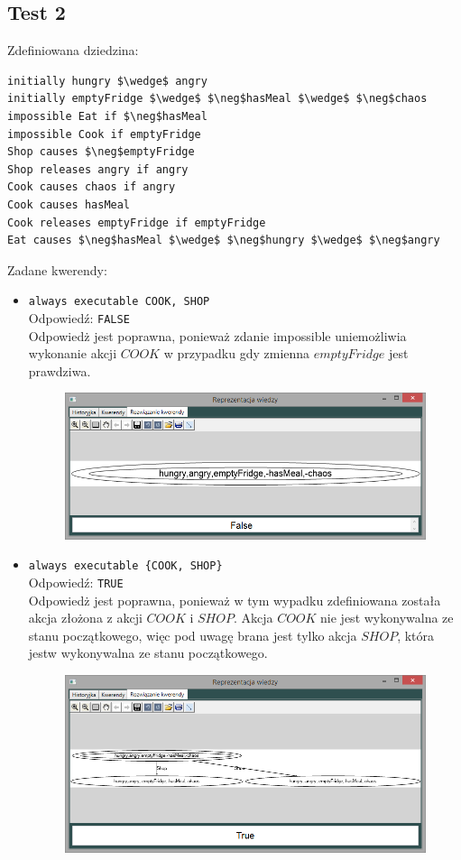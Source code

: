 \documentclass{article}
\begin{document}
\subsection{Test 2}
Zdefiniowana dziedzina:
\bigskip
{}
\begin{lstlisting}[mathescape=true]
initially hungry $\wedge$ angry
initially emptyFridge $\wedge$ $\neg$hasMeal $\wedge$ $\neg$chaos 
impossible Eat if $\neg$hasMeal 
impossible Cook if emptyFridge
Shop causes $\neg$emptyFridge
Shop releases angry if angry
Cook causes chaos if angry
Cook causes hasMeal 
Cook releases emptyFridge if emptyFridge
Eat causes $\neg$hasMeal $\wedge$ $\neg$hungry $\wedge$ $\neg$angry
\end{lstlisting}
Zadane kwerendy:
\begin{itemize}
    \item {\large\texttt{always executable COOK, SHOP}}\\
    Odpowiedź: \texttt{FALSE}\\
    Odpowiedż jest poprawna, ponieważ zdanie impossible uniemożliwia wykonanie akcji $COOK$ w przypadku gdy zmienna $emptyFridge$ jest prawdziwa.
    \begin{figure}[H]
    \centering
    \includegraphics[scale=0.5]{test2_1}
    \end{figure}
    \item {\large\texttt{always executable \{COOK, SHOP\}}}\\
    Odpowiedź: \texttt{TRUE}\\
    Odpowiedż jest poprawna, ponieważ w tym wypadku zdefiniowana została akcja złożona z akcji $COOK$ i $SHOP$. Akcja $COOK$ nie jest wykonywalna ze stanu początkowego, więc pod uwagę brana jest tylko akcja $SHOP$, która jestw wykonywalna ze stanu początkowego. 
    \begin{figure}[H]
    \centering
    \includegraphics[scale=0.5]{test2_2}

\end{figure}
\end{itemize}
\end{document}
